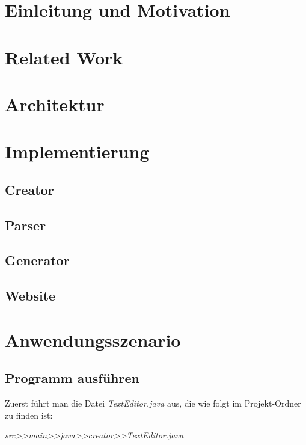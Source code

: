 \documentclass[a4paper,12pt,headsepline,twocolumn]{scrartcl}
\begin{document}
\section{Einleitung und Motivation}


\section{Related Work}



\section{Architektur}


\section{Implementierung}

\subsection{Creator}



\subsection{Parser}



\subsection{Generator}



\subsection{Website}



\section{Anwendungsszenario}
\subsection{Programm ausführen}
Zuerst führt man die Datei \textit{TextEditor.java} aus, die wie folgt im Projekt-Ordner zu finden ist:\newline 

\textit{src>>main>>java>>creator>>TextEditor.java}\newline 
\end{document}
